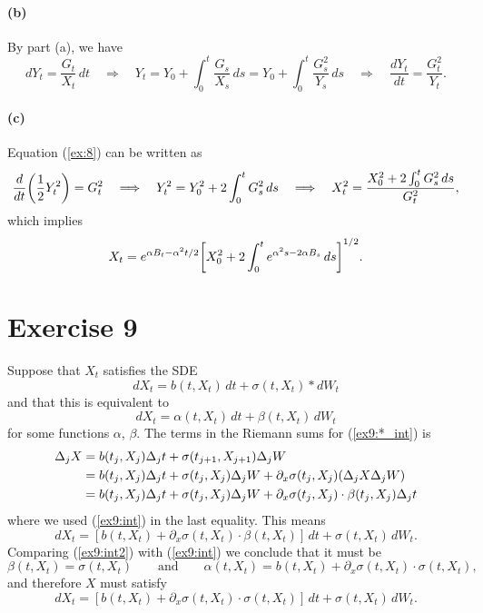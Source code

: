 \documentclass[a4paper,11pt]{article}
\theoremstyle{definition}
\theoremstyle{plain}
\theoremstyle{remark}
\DeclarePairedDelimiter{\parr}{(}{)}
\DeclarePairedDelimiter{\parq}{[}{]}
\begin{document}
\paragraph*{(b)} By part (a), we have
\begin{equation}
dY_t = \frac{G_t}{X_t}\,dt \quad\Longrightarrow\quad Y_t = Y_0 + \int_0^t \frac{G_s}{X_s}\,ds = Y_0 + \int_0^t \frac{G_s^2}{Y_s}\,ds \quad\Longrightarrow\quad \frac{dY_t}{dt} = \frac{G_t^2}{Y_t}.
\label{ex:8}
\end{equation}

\paragraph*{(c)}
Equation (\ref{ex:8}) can be written as 
$$
\frac{d}{dt}\parr*{\frac{1}{2}Y_t^2} = G_t^2 \quad\Longrightarrow\quad Y_t^2 = Y_0^2 + 2\int_0^tG_s^2\,ds \quad\Longrightarrow\quad X_t^2 = \frac{X_0^2 + 2\int_0^tG_s^2\,ds}{G_t^2},
$$
which implies
$$
X_t = e^{\alpha B_t-\alpha^2t/2}\parq*{X_0^2+2\int_0^te^{\alpha^2s-2\alpha B_s}\,ds}^{1/2}.
$$

\section*{Exercise 9}

Suppose that $X_t$ satisfies the SDE 
\begin{equation}
dX_t = b(t,X_t)\,dt + \sigma(t,X_t)*dW_t
\label{ex9:*_int}
\end{equation}
and that this is equivalent to
\begin{equation} 
\label{ex9:int}
dX_t = \alpha(t,X_t)\,dt + \beta(t,X_t)\,dW_t
\end{equation}
for some functions $\alpha$, $\beta$. The terms in the Riemann sums
for (\ref{ex9:*_int}) is
\begin{align}
\Delta_j X & = b(t_j,X_j)\Delta_j t + \sigma(t_{j+1},X_{j+1})\Delta_j W \notag\\ & = b(t_j,X_j)\Delta_j t + \sigma(t_j,X_j)\Delta_jW+\partial_x\sigma(t_j,X_j)(\Delta_jX\Delta_jW) \notag\\ & = b(t_j,X_j)\Delta_j t + \sigma(t_j,X_j)\Delta_jW+\partial_x\sigma(t_j,X_j)
\cdot\beta(t_j,X_j)\Delta_jt \notag
\end{align}
where we used (\ref{ex9:int}) in the last equality. This means
\begin{equation}
dX_t = [b(t,X_t)+\partial_x\sigma(t,X_t)
\cdot\beta(t,X_t)]\,dt + \sigma(t,X_t)\,dW_t.
\label{ex9:int2}
\end{equation}
Comparing (\ref{ex9:int2}) with (\ref{ex9:int}) we conclude that it must be
$$
\beta(t,X_t) = \sigma(t,X_t) \qquad\text{and}\qquad \alpha(t,X_t) = b(t,X_t)+\partial_x\sigma(t,X_t)\cdot \sigma(t,X_t),
$$
and therefore $X$ must satisfy
$$
dX_t = [b(t,X_t)+\partial_x\sigma(t,X_t)\cdot \sigma(t,X_t)]\,dt + \sigma(t,X_t)\,dW_t.
$$
\end{document}

